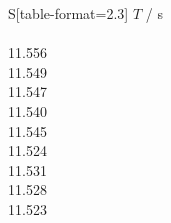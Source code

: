 \begin{subtable}{0.18\textwidth}
\centering
{}
\label{tab:magnet0-5}
\begin{tabular}{S[table-format=2.3]}
\toprule
{$T$ / s} \\
 \\
11.556 \\
11.549 \\
11.547 \\
11.540 \\
11.545 \\
11.524 \\
11.531 \\
11.528 \\
11.523 \\
\bottomrule
\end{tabular}
\end{subtable}